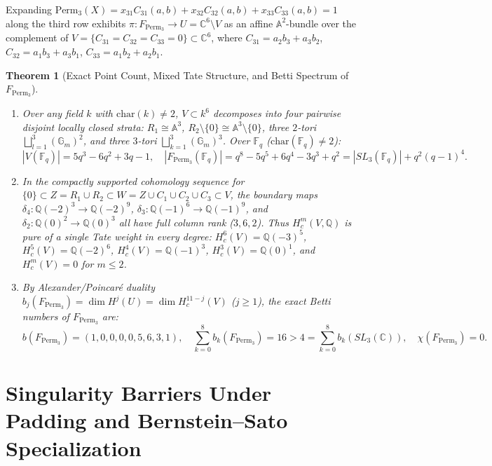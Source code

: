 \documentclass[11pt,a4paper]{article}
\newtheorem{theorem}{Theorem}[section]
\theoremstyle{definition}
\begin{document}
Expanding $\text{Perm}_3(X) = x_{31}C_{31}(a,b) + x_{32}C_{32}(a,b) + x_{33}C_{33}(a,b) = 1$ along the third row exhibits $\pi: F_{\text{Perm}_3} \to U = \mathbb{C}^6 \setminus V$ as an affine $\mathbb{A}^2$-bundle over the complement of $V = \{C_{31} = C_{32} = C_{33} = 0\} \subset \mathbb{C}^6$, where $C_{31} = a_2 b_3 + a_3 b_2$, $C_{32} = a_1 b_3 + a_3 b_1$, $C_{33} = a_1 b_2 + a_2 b_1$.

\begin{theorem}[Exact Point Count, Mixed Tate Structure, and Betti Spectrum of $F_{\text{Perm}_3}$]
\label{thm:betti}
\begin{enumerate}
    \item Over any field $k$ with $\text{char}(k) \neq 2$, $V \subset k^6$ decomposes into four pairwise disjoint locally closed strata: $R_1 \cong \mathbb{A}^3$, $R_2 \setminus \{0\} \cong \mathbb{A}^3 \setminus \{0\}$, three $2$-tori $\bigsqcup_{l=1}^3 (\mathbb{G}_m)^2$, and three $3$-tori $\bigsqcup_{k=1}^3 (\mathbb{G}_m)^3$. Over $\mathbb{F}_q$ ($\text{char}(\mathbb{F}_q) \neq 2$):
    $$|V(\mathbb{F}_q)| = 5q^3 - 6q^2 + 3q - 1, \quad |F_{\text{Perm}_3}(\mathbb{F}_q)| = q^8 - 5q^5 + 6q^4 - 3q^3 + q^2 = |SL_3(\mathbb{F}_q)| + q^2(q-1)^4.$$
    \item In the compactly supported cohomology sequence for $\{0\} \subset Z = R_1 \cup R_2 \subset W = Z \cup C_1 \cup C_2 \cup C_3 \subset V$, the boundary maps $\delta_4: \mathbb{Q}(-2)^3 \to \mathbb{Q}(-2)^9$, $\delta_3: \mathbb{Q}(-1)^6 \to \mathbb{Q}(-1)^9$, and $\delta_2: \mathbb{Q}(0)^2 \to \mathbb{Q}(0)^3$ all have full column rank ($3, 6, 2$). Thus $H^m_c(V, \mathbb{Q})$ is pure of a single Tate weight in every degree: $H^6_c(V) = \mathbb{Q}(-3)^5$, $H^5_c(V) = \mathbb{Q}(-2)^6$, $H^4_c(V) = \mathbb{Q}(-1)^3$, $H^3_c(V) = \mathbb{Q}(0)^1$, and $H^m_c(V) = 0$ for $m \le 2$.
    \item By Alexander/Poincar\'e duality $b_j(F_{\text{Perm}_3}) = \dim H^j(U) = \dim H^{11-j}_c(V)$ ($j \ge 1$), the exact Betti numbers of $F_{\text{Perm}_3}$ are:
    $$b(F_{\text{Perm}_3}) = (1, 0, 0, 0, 0, 5, 6, 3, 1), \quad \sum_{k=0}^8 b_k(F_{\text{Perm}_3}) = 16 > 4 = \sum_{k=0}^8 b_k(SL_3(\mathbb{C})), \quad \chi(F_{\text{Perm}_3}) = 0.$$
\end{enumerate}
\end{theorem}

\section{Singularity Barriers Under Padding and Bernstein--Sato Specialization}
\end{document}
